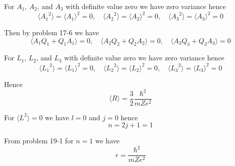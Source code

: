 


\bigskip
For $A_1$, $A_2$, and $A_3$ with definite value zero we have zero variance hence
\begin{equation*}
\langle{A_1}^2\rangle=\langle A_1\rangle^2=0,\quad
\langle{A_2}^2\rangle=\langle A_2\rangle^2=0,\quad
\langle{A_3}^2\rangle=\langle A_3\rangle^2=0
\end{equation*}

Then by problem 17-6 we have
\begin{equation*}
\langle A_1Q_1+Q_1A_1\rangle=0,\quad
\langle A_2Q_2+Q_2A_2\rangle=0,\quad
\langle A_3Q_3+Q_3A_3\rangle=0
\end{equation*}

For $L_1$, $L_2$, and $L_3$ with definite value zero we have zero variance hence
\begin{equation*}
\langle{L_1}^2\rangle=\langle L_1\rangle^2=0,\quad
\langle{L_2}^2\rangle=\langle L_2\rangle^2=0,\quad
\langle{L_3}^2\rangle=\langle L_3\rangle^2=0
\end{equation*}

Hence
\begin{equation*}
\langle R\rangle=\frac{3}{2}\frac{\hbar^2}{mZe^2}
\end{equation*}

For $\langle L^2\rangle=0$ we have $l=0$ and $j=0$ hence
\begin{equation*}
n=2j+1=1
\end{equation*}

From problem 19-1 for $n=1$ we have
\begin{equation*}
r=\frac{\hbar^2}{mZe^2}
\end{equation*}

